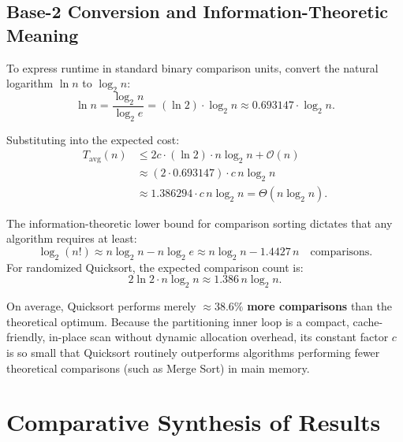 \subsection{Base-2 Conversion and Information-Theoretic Meaning}
\label{subsec:log2-conversion-information}

To express runtime in standard binary comparison units, convert the natural logarithm $\ln n$ to $\log_2 n$:
\begin{equation}
  \ln n = \frac{\log_2 n}{\log_2 e} = (\ln 2) \cdot \log_2 n \approx 0.693147 \cdot \log_2 n.
\end{equation}

Substituting into the expected cost:
\begin{align}
  T_{\text{avg}}(n) &\le 2c \cdot (\ln 2) \cdot n \log_2 n + \mathcal{O}(n) \\
  &\approx (2 \cdot 0.693147) \cdot c \, n \log_2 n \\
  &\approx 1.386294 \cdot c \, n \log_2 n = \Theta(n \log_2 n).
\end{align}

\begin{theorem}
The information-theoretic lower bound for comparison sorting dictates that any algorithm requires at least:
\begin{equation}
  \log_2(n!) \approx n \log_2 n - n \log_2 e \approx n \log_2 n - 1.4427 \, n \quad \text{comparisons}.
\end{equation}
For randomized Quicksort, the expected comparison count is:
\begin{equation}
  2 \ln 2 \cdot n \log_2 n \approx 1.386 \, n \log_2 n.
\end{equation}
\end{theorem}

\begin{property}
On average, Quicksort performs merely $\approx \mathbf{38.6\%}$ \textbf{more comparisons} than the theoretical optimum. Because the partitioning inner loop is a compact, cache-friendly, in-place scan without dynamic allocation overhead, its constant factor $c$ is so small that Quicksort routinely outperforms algorithms performing fewer theoretical comparisons (such as Merge Sort) in main memory.
\end{property}

\FloatBarrier
\section{Comparative Synthesis of Results}
\label{sec:comparative-results-summary}

